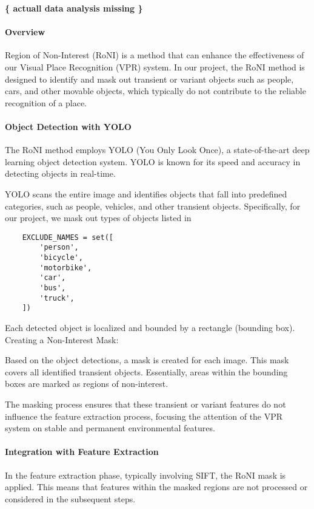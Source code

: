 \documentclass[conference]{IEEEtran}
\begin{document}
\textbf{ \{ actuall data analysis missing \} }

\paragraph{Overview}

Region of Non-Interest (RoNI) is a method that can enhance the effectiveness of our Visual Place Recognition (VPR) system. In our project, the RoNI method is designed to identify and mask out transient or variant objects such as people, cars, and other movable objects, which typically do not contribute to the reliable recognition of a place.

\paragraph{Object Detection with YOLO}

The RoNI method employs YOLO (You Only Look Once), a state-of-the-art deep learning object detection system. YOLO is known for its speed and accuracy in detecting objects in real-time.

YOLO scans the entire image and identifies objects that fall into predefined categories, such as people, vehicles, and other transient objects. Specifically, for our project, we mask out types of objects listed in 
\begin{verbatim}
    EXCLUDE_NAMES = set([
        'person',
        'bicycle',
        'motorbike',
        'car',
        'bus',
        'truck',
    ])
\end{verbatim}

Each detected object is localized and bounded by a rectangle (bounding box).
Creating a Non-Interest Mask:

Based on the object detections, a mask is created for each image. This mask covers all identified transient objects. Essentially, areas within the bounding boxes are marked as regions of non-interest.

The masking process ensures that these transient or variant features do not influence the feature extraction process, focusing the attention of the VPR system on stable and permanent environmental features.

\paragraph{Integration with Feature Extraction}

In the feature extraction phase, typically involving SIFT, the RoNI mask is applied. This means that features within the masked regions are not processed or considered in the subsequent steps.
\end{document}
